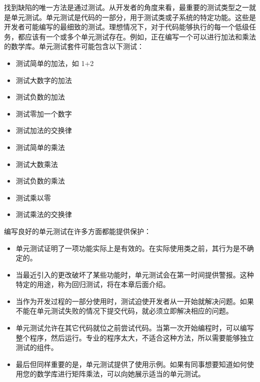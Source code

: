 
找到缺陷的唯一方法是通过测试。从开发者的角度来看，最重要的测试类型之一就是单元测试。单元测试是代码的一部分，用于测试类或子系统的特定功能。这些是开发者可能编写的最细致的测试。理想情况下，对于代码能够执行的每一个低级任务，都应该有一个或多个单元测试存在。例如，正在编写一个可以进行加法和乘法的数学库。单元测试套件可能包含以下测试：

\begin{itemize}
\item
测试简单的加法，如 1+2

\item
测试大数字的加法

\item
测试负数的加法

\item
测试零加一个数字

\item
测试加法的交换律

\item
测试简单的乘法

\item
测试大数乘法

\item
测试负数的乘法

\item
测试乘以零

\item
测试乘法的交换律
\end{itemize}

编写良好的单元测试在许多方面都能提供保护：

\begin{itemize}
\item
单元测试证明了一项功能实际上是有效的。在实际使用类之前，其行为是不确定的。

\item
当最近引入的更改破坏了某些功能时，单元测试会在第一时间提供警报。这种特定的用途，称为回归测试，将在本章后面介绍。

\item
当作为开发过程的一部分使用时，测试迫使开发者从一开始就解决问题。如果不能在单元测试失败的情况下提交代码，就必须立即解决相应的问题。

\item
单元测试允许在其它代码就位之前尝试代码。当第一次开始编程时，可以编写整个程序，然后运行。专业的程序太大，不适合这种方法，所以需要能够独立测试的组件。

\item
最后但同样重要的是，单元测试提供了使用示例。如果有同事想要知道如何使用您的数学库进行矩阵乘法，可以向她展示适当的单元测试。
\end{itemize}

